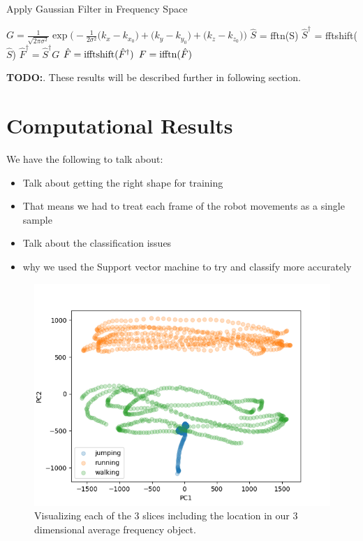 \documentclass[11pt]{amsart}
\begin{document}
\begin{algorithm}
\caption{Apply Gaussian Filter in Frequency Space}\label{alg:classification}
\begin{algorithmic}
\State $ G = \frac {1}{\sqrt{2 \pi \sigma^2}}\exp \Big( - \frac{1}{2 \sigma^2 }\big(k_x - k_{x_0}\big) + \big(k_y - k_{y_0}\big) + \big(k_z - k_{z_0}\big) \Big)$ 
\State $\hat S$ = fftn(S)
\State $\hat S^\dag$ = fftshift($\hat S$)
\State $\hat F^\dag = \hat S^\dag G$ 
\State $\hat F = {\rm ifftshift}(\hat F^\dag)$
\State $F = {\rm ifftn}(\hat F)$ 
\end{algorithmic}
\end{algorithm}

\textbf{TODO:}. These results will be described further in following section.

\section{Computational Results}\label{sec:results}
We have the following to talk about:
\begin{itemize}
\item Talk about getting the right shape for training
\item That means we had to treat each frame of the robot movements as a single sample
\item Talk about the classification issues
\item why we used the Support vector machine to try and classify more accurately
\end{itemize}

\begin{figure}[h]
	\centering
	\includegraphics[width=.5\textwidth]{../visualizations/pca_2_components_plot.png}
 	\caption{Visualizing each of the 3 slices including the location in our 3 dimensional average frequency object.}\label{fig:f1_0}
\end{figure}
\end{document}
